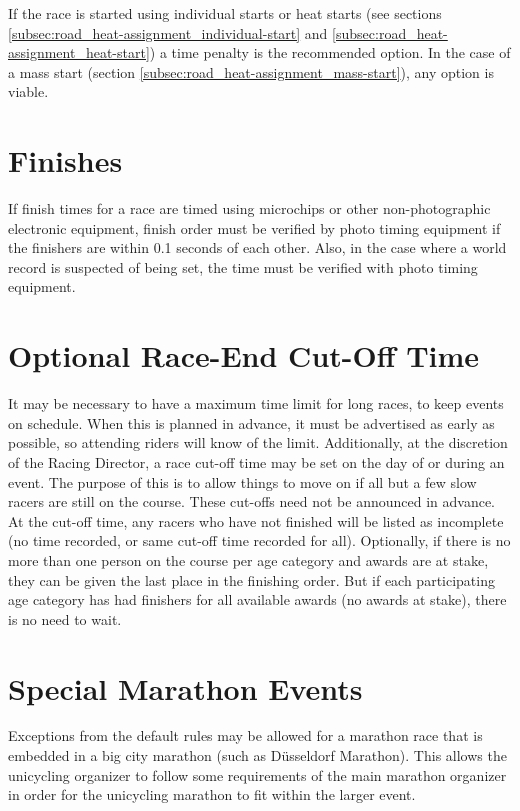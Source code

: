 If the race is started using individual starts or heat starts (see sections \ref{subsec:road_heat-assignment_individual-start} and \ref{subsec:road_heat-assignment_heat-start}) a time penalty is the recommended option.
In the case of a mass start (section \ref{subsec:road_heat-assignment_mass-start}), any option is viable.

\section{Finishes}

If finish times for a race are timed using microchips or other non-photographic electronic equipment, finish order must be verified by photo timing equipment if the finishers are within 0.1 seconds of each other.
Also, in the case where a world record is suspected of being set, the time must be verified with photo timing equipment.

\section{Optional Race-End Cut-Off Time}

It may be necessary to have a maximum time limit for long races, to keep events on schedule.
When this is planned in advance, it must be advertised as early as possible, so attending riders will know of the limit.
Additionally, at the discretion of the Racing Director, a race cut-off time may be set on the day of or during an event.
The purpose of this is to allow things to move on if all but a few slow racers are still on the course.
These cut-offs need not be announced in advance.
At the cut-off time, any racers who have not finished will be listed as incomplete (no time recorded, or same cut-off time recorded for all).
Optionally, if there is no more than one person on the course per age category and awards are at stake, they can be given the last place in the finishing order.
But if each participating age category has had finishers for all available awards (no awards at stake), there is no need to wait.

\section{Special Marathon Events}

Exceptions from the default rules may be allowed for a marathon race that is embedded in a big city marathon (such as Düsseldorf Marathon).
This allows the unicycling organizer to follow some requirements of the main marathon organizer in order for the unicycling marathon to fit within the larger event.

